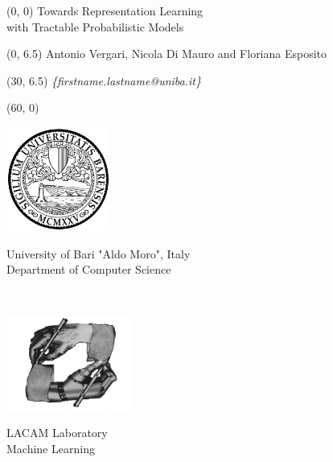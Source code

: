 \documentclass[final]{beamer}
\begin{document}
\begin{frame}{}
  \begin{textblock}{58}(0, 0)
    \huge
    Towards Representation Learning\\
    with Tractable Probabilistic Models
  \end{textblock}
  \begin{textblock}{30}(0, 6.5)
    \small
    Antonio  Vergari, Nicola  {Di Mauro} and Floriana Esposito
  \end{textblock}
  \begin{textblock}{15}(30, 6.5)
    \small
    \emph{\{firstname.lastname@uniba.it\}}
  \end{textblock}
  \begin{textblock}{30}(60, 0)
    \footnotesize
    \begin{minipage}[t]{5cm}
      \vspace{0pt}\hspace{5pt}
      \includegraphics[width=97pt]{figures/unibaba}
    \end{minipage}\hspace{-15pt}
    \begin{minipage}[t]{15cm}
    \vspace{20pt}
      \flushleft
      University of Bari "Aldo Moro", Italy\\
    \vspace{2pt}
      Department of Computer Science
    \end{minipage}\\[0.75cm]
    \footnotesize
    \begin{minipage}[t]{5cm}
      \vspace{0pt}
      \includegraphics[width=117pt]{figures/lacam}
    \end{minipage}\hspace{-15pt}
    \begin{minipage}[t]{15cm}
      \vspace{23pt}
      \flushleft
      LACAM Laboratory\\
      \vspace{2pt}
      Machine Learning
    \end{minipage}
  \end{textblock}
  

\end{frame}
\end{document}

